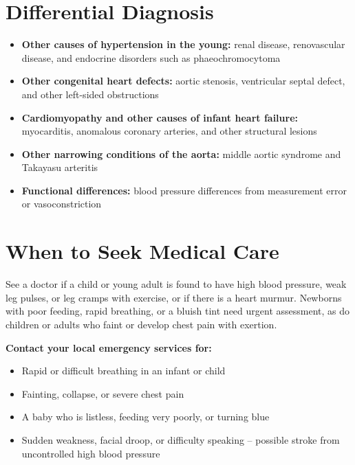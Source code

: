 \section*{Differential Diagnosis}
\begin{itemize}
    \item \textbf{Other causes of hypertension in the young:} renal disease, renovascular disease, and endocrine disorders such as phaeochromocytoma
    \item \textbf{Other congenital heart defects:} aortic stenosis, ventricular septal defect, and other left-sided obstructions
    \item \textbf{Cardiomyopathy and other causes of infant heart failure:} myocarditis, anomalous coronary arteries, and other structural lesions
    \item \textbf{Other narrowing conditions of the aorta:} middle aortic syndrome and Takayasu arteritis
    \item \textbf{Functional differences:} blood pressure differences from measurement error or vasoconstriction
\end{itemize}

\section*{When to Seek Medical Care}
See a doctor if a child or young adult is found to have high blood pressure, weak leg pulses, or leg cramps with exercise, or if there is a heart murmur. Newborns with poor feeding, rapid breathing, or a bluish tint need urgent assessment, as do children or adults who faint or develop chest pain with exertion.

\textbf{Contact your local emergency services for:}
\begin{itemize}
    \item Rapid or difficult breathing in an infant or child
    \item Fainting, collapse, or severe chest pain
    \item A baby who is listless, feeding very poorly, or turning blue
    \item Sudden weakness, facial droop, or difficulty speaking -- possible stroke from uncontrolled high blood pressure
\end{itemize}

